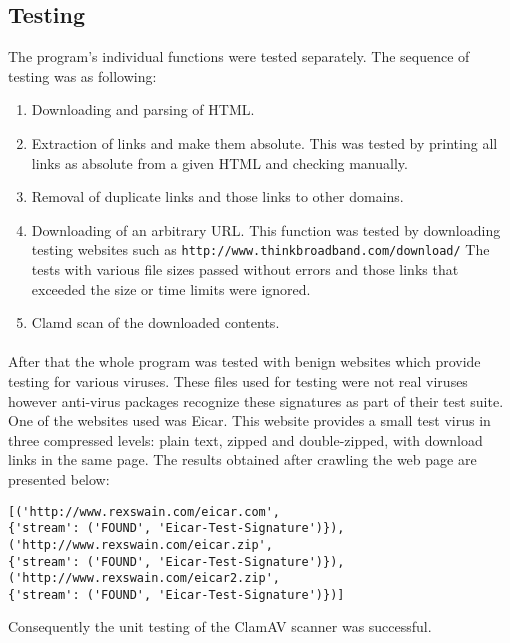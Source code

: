 \subsection{Testing}
The program's individual functions were tested separately. The sequence of 
testing was as following:
\begin{enumerate}
\item Downloading and parsing of HTML.
\item Extraction of links and make them absolute.
This was tested by printing all links as absolute from a given HTML and checking 
manually.
\item Removal of duplicate links and those links to other domains.
\item Downloading of an arbitrary URL.
This function was tested by downloading testing websites such as
\verb`http://www.thinkbroadband.com/download/`
The tests with various file 
sizes passed without errors and those links that exceeded the size or time limits were 
ignored. 
\item Clamd scan of the downloaded contents. 
\end{enumerate}
\paragraph{}
After that the whole program was tested with benign websites which provide 
testing for various viruses. These files used for testing were not real viruses however anti-virus packages recognize these signatures 
as part of their test suite. 
One of the websites used was Eicar\cite{eicar}. This website provides a small test 
virus in three compressed levels: plain text, zipped and double-zipped, with 
download links in the same page. The results obtained after 
crawling the web page are presented below:
\begin{verbatim}
[('http://www.rexswain.com/eicar.com', 
{'stream': ('FOUND', 'Eicar-Test-Signature')}), 
('http://www.rexswain.com/eicar.zip', 
{'stream': ('FOUND', 'Eicar-Test-Signature')}), 
('http://www.rexswain.com/eicar2.zip', 
{'stream': ('FOUND', 'Eicar-Test-Signature')})]
\end{verbatim}
Consequently the unit testing of the ClamAV scanner was successful. 
